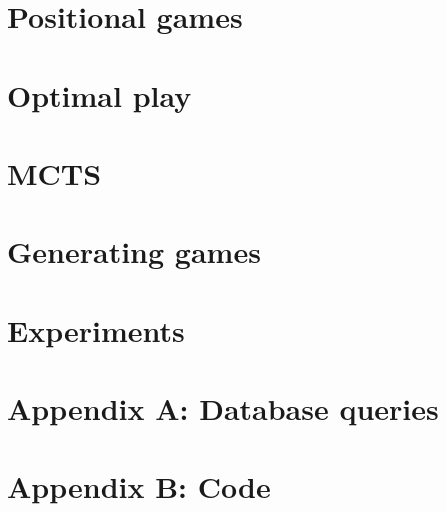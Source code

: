 \documentclass[12pt]{article}
\begin{document}
\section{Positional games}
\label{sec:positional_games}


\section{Optimal play}
\label{sec:optimal_play}


\section{MCTS}
\label{sec:mcts}


\section{Generating games}
\label{sec:generating_games}


\section{Experiments}
\label{sec:experiments}


\section{Appendix A: Database queries}
\label{sec:database_queries}


\section{Appendix B: Code}
\label{sec:code}


% 



\end{document}
